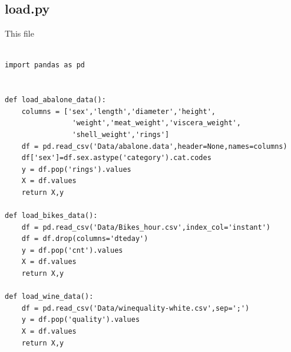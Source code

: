 \documentclass{article}
\begin{document}
\subsection{load.py}
This file 
\begin{verbatim}

import pandas as pd


def load_abalone_data():
    columns = ['sex','length','diameter','height',
                'weight','meat_weight','viscera_weight',
                'shell_weight','rings']
    df = pd.read_csv('Data/abalone.data',header=None,names=columns)
    df['sex']=df.sex.astype('category').cat.codes
    y = df.pop('rings').values
    X = df.values
    return X,y

def load_bikes_data():
    df = pd.read_csv('Data/Bikes_hour.csv',index_col='instant')
    df = df.drop(columns='dteday')
    y = df.pop('cnt').values
    X = df.values
    return X,y

def load_wine_data():
    df = pd.read_csv('Data/winequality-white.csv',sep=';')
    y = df.pop('quality').values
    X = df.values
    return X,y
\end{verbatim}
\clearpage
 

\end{document}
